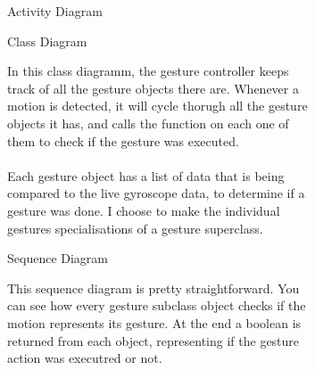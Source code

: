 \documentclass{article}
\begin{document}
		\begin{figure}[htbp]
			\centering
			\begin{subfigure}{\textwidth}
				\resizebox{\textwidth}{!}{}
				\caption{Activity Diagram}
			\end{subfigure}
			\begin{subfigure}{\textwidth}
			\end{subfigure}
		\end{figure}
		\clearpage

		\begin{figure}[htbp]
			\centering
			\begin{subfigure}{\textwidth}
				\resizebox{\textwidth}{!}{}
				\caption{Class Diagram}
			\end{subfigure}
			\begin{subfigure}{\textwidth}
				\vspace{1em}
				In this class diagramm, the gesture controller keeps track of all the gesture objects there are.
				Whenever a motion is detected, it will cycle thorugh all the gesture objects it has, and calls the function on each one
				of them to check if the gesture was executed.
				\\ \\
				Each gesture object has a list of data that is being compared to the live gyroscope data, to determine if a gesture was done.
				I choose to make the individual gestures specialisations of a gesture superclass.
			\end{subfigure}
		\end{figure}
		\clearpage

		\begin{figure}[htbp]
			\centering
			\begin{subfigure}{\textwidth}
				\resizebox{\textwidth}{!}{}
				\caption{Sequence Diagram}
			\end{subfigure}
			\begin{subfigure}{\textwidth}
				\vspace{1em}
				This sequence diagram is pretty straightforward. You can see how every gesture subclass object checks if the motion
				represents its gesture. At the end a boolean is returned from each object, representing if the gesture action was executred or not.
			\end{subfigure}
		\end{figure}
		\clearpage
	
\end{document}
